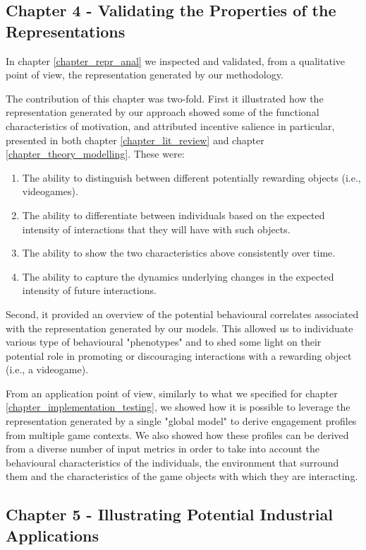 \subsection{Chapter 4 - Validating the Properties of the Representations}
\label{discussion_chapter_four}
In chapter \ref{chapter_repr_anal} we inspected and validated, from a qualitative point of view, the representation generated by our methodology.

The contribution of this chapter was two-fold. First it illustrated how the representation generated by our approach showed some of the functional characteristics of motivation, and attributed incentive salience in particular, presented in both chapter \ref{chapter_lit_review} and chapter \ref{chapter_theory_modelling}. These were:

\begin{enumerate}
    \item The ability to distinguish between different potentially rewarding objects (i.e., videogames).
    \item The ability to differentiate between individuals based on the expected intensity of interactions that they will have with such objects.
    \item The ability to show the two characteristics above consistently over time.
    \item The ability to capture the dynamics underlying changes in the expected intensity of future interactions.
\end{enumerate}

Second, it provided an overview of the potential behavioural correlates associated with the representation generated by our models. This allowed us to individuate various type of behavioural "phenotypes" and to shed some light on their potential role in promoting or discouraging interactions with a rewarding object (i.e., a videogame).

From an application point of view, similarly to what we specified for chapter \ref{chapter_implementation_testing}, we showed how it is possible to leverage the representation generated by a single "global model" to derive engagement profiles from multiple game contexts. We also showed how these profiles can be derived from a diverse number of input metrics in order to take into account the behavioural characteristics of the individuals, the environment that surround them and the characteristics of the game objects with which they are interacting.


\subsection{Chapter 5 - Illustrating Potential Industrial Applications}
\label{discussion_chapter_five}

